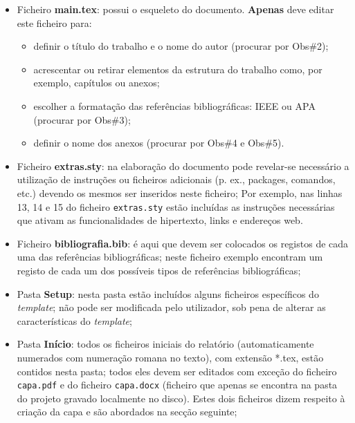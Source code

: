     \begin{itemize}
        \item Ficheiro \textbf{main.tex}: possui o esqueleto do documento. \textbf{Apenas} deve editar este ficheiro para: 
            \begin{itemize}
                  \item definir o título do trabalho e o nome do autor (procurar por Obs\#2);
                  \item acrescentar ou retirar elementos da estrutura do trabalho como, por exemplo, capítulos ou anexos;
                  \item escolher a formatação das referências bibliográficas: IEEE ou APA (procurar por Obs\#3);
                  \item definir o nome dos anexos (procurar por Obs\#4 e Obs\#5).  
            \end{itemize}
        
        \item Ficheiro \textbf{extras.sty}: na elaboração do documento pode revelar-se necessário a utilização de instruções ou ficheiros adicionais (p. ex., packages, comandos, etc.) devendo os mesmos ser inseridos neste ficheiro; Por exemplo, nas linhas 13, 14 e 15 do ficheiro \verb|extras.sty| estão incluídas as instruções necessárias que ativam as funcionalidades de hipertexto, links e endereços web.
         
        \item Ficheiro \textbf{bibliografia.bib}: é aqui que devem ser colocados os registos de cada uma das referências bibliográficas; neste ficheiro exemplo encontram um  registo de cada um dos possíveis tipos de referências bibliográficas;
        
        \item Pasta \textbf{Setup}: nesta pasta estão incluídos alguns ficheiros específicos do \textit{template}; não pode ser modificada pelo utilizador, sob pena de alterar as características do \textit{template};
    
        \item Pasta \textbf{Início}: todos os ficheiros iniciais do relatório (automaticamente numerados com numeração romana no texto), com extensão *.tex, estão contidos nesta pasta; todos eles devem ser editados com exceção do ficheiro \verb|capa.pdf| e 
        do ficheiro \verb|capa.docx| (ficheiro que apenas se encontra na pasta do projeto gravado localmente no disco). Estes dois ficheiros dizem respeito à criação da capa e são abordados na secção seguinte;
        

\end{itemize}
